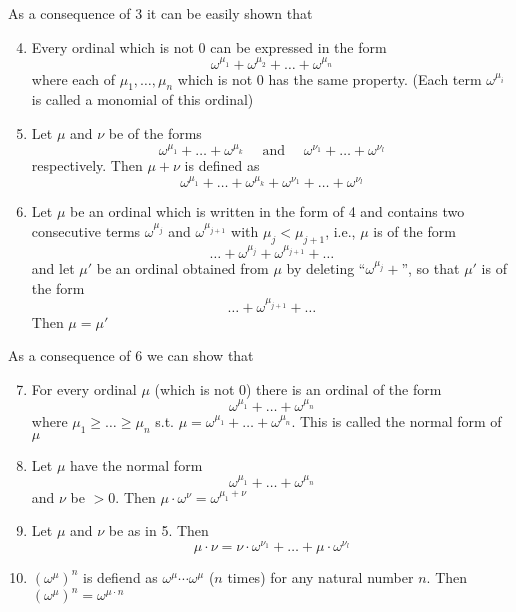 \documentclass[11pt]{article}
\begin{document}
As a consequence of 3 it can be easily shown that
\begin{enumerate}
\setcounter{enumi}{3}
\item Every ordinal which is not 0 can be expressed in the form
  \begin{equation*}
\omega^{\mu_1}+\omega^{\mu_2}+\dots+\omega^{\mu_n}
  \end{equation*}
where each of \(\mu_1,\dots,\mu_n\) which is not 0 has the same property. (Each
term \(\omega^{\mu_i}\) is called a monomial of this ordinal)
\item Let \(\mu\) and \(\nu\) be of the forms
\begin{equation*}
\omega^{\mu_1}+\dots+\omega^{\mu_k}\quad\text{ and }\quad
\omega^{\nu_1}+\dots+\omega^{\nu_l}
\end{equation*}
respectively. Then \(\mu+\nu\) is defined as
\begin{equation*}
\omega^{\mu_1}+\dots+\omega^{\mu_k}+
\omega^{\nu_1}+\dots+\omega^{\nu_l}
\end{equation*}
\item Let \(\mu\) be an ordinal which is written in the form of 4 and contains two consecutive
terms \(\omega^{\mu_j}\) and \(\omega^{\mu_{j+1}}\) with \(\mu_j<\mu_{j+1}\), i.e., \(\mu\) is of the form
\begin{equation*}
\dots+\omega^{\mu_j}+\omega^{\mu_{j+1}}+\dots
\end{equation*}
and let \(\mu'\) be an ordinal obtained from \(\mu\) by deleting ``\(\omega^{\mu_j}+\)'', so
that \(\mu'\) is of the form
\begin{equation*}
\dots+\omega^{\mu_{j+1}}+\dots
\end{equation*}
Then \(\mu=\mu'\)
\end{enumerate}


As a consequence of 6 we can show that
\begin{enumerate}
\setcounter{enumi}{6}
\item For every ordinal \(\mu\)  (which is not 0) there is an ordinal of the form
\begin{equation*}
\omega^{\mu_1}+\dots+\omega^{\mu_n}
\end{equation*}
where \(\mu_1\ge\dots\ge\mu_n\) s.t. \(\mu=\omega^{\mu_1}+\dots+\omega^{\mu_n}\). This is
called the normal form of \(\mu\)
\item Let \(\mu\) have the normal form
\begin{equation*}
\omega^{\mu_1}+\dots+\omega^{\mu_n}
\end{equation*}
and \(\nu\) be \(>0\). Then \(\mu\cdot\omega^{\nu}=\omega^{\mu_1+\nu}\)
\item Let \(\mu\) and \(\nu\) be as in 5. Then
\begin{equation*}
\mu\cdot\nu=\nu\cdot\omega^{\nu_1}+\dots+\mu\cdot\omega^{\nu_l}
\end{equation*}
\item \((\omega^\mu)^n\) is defiend as \(\omega^\mu\cdots\omega^\mu\) (\(n\) times) for any natural
number \(n\). Then \((\omega^\mu)^n=\omega^{\mu\cdot n}\)
\end{enumerate}
\end{document}

